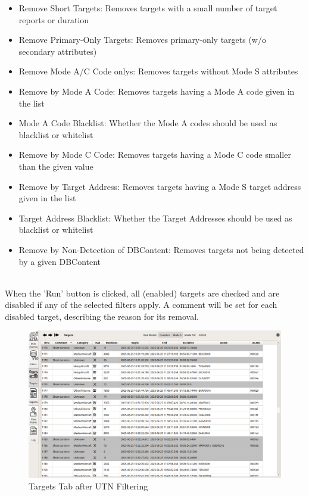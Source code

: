 \begin{itemize}  
\item Remove Short Targets: Removes targets with a small number of target reports or duration
\item Remove Primary-Only Targets: Removes primary-only targets (w/o secondary attributes)
\item Remove Mode A/C Code onlys: Removes targets without Mode S attributes
\item Remove by Mode A Code: Removes targets having a Mode A code given in the list
\item Mode A Code Blacklist: Whether the Mode A codes should be used as blacklist or whitelist
\item Remove by Mode C Code: Removes targets having a Mode C code smaller than the given value
\item Remove by Target Address: Removes targets having a Mode S target address given in the list
\item Target Address Blacklist: Whether the Target Addresses should be used as blacklist or whitelist
\item Remove by Non-Detection of DBContent: Removes targets not being detected by a given DBContent
\end{itemize}
\ \\

When the 'Run' button is clicked, all (enabled) targets are checked and are disabled if any of the selected filters apply.
A comment will be set for each disabled target, describing the reason for its removal.

\begin{figure}[H]
  \hspace*{-2cm}
    \includegraphics[width=18cm,frame]{figures/filter_utns_done.png}
  \caption{Targets Tab after UTN Filtering}
\end{figure}
